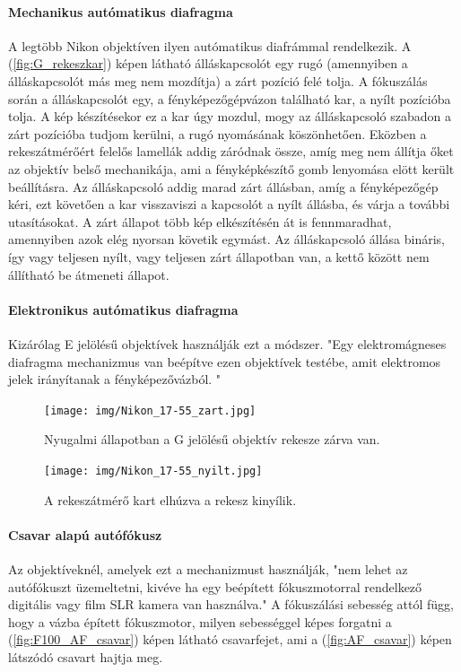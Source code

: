 \paragraph{Mechanikus autómatikus diafragma}
A legtöbb Nikon objektíven ilyen autómatikus diafrámmal rendelkezik. A (\ref{fig:G_rekeszkar}) képen látható álláskapcsolót egy rugó (amennyiben a álláskapcsolót más meg nem mozdítja) a zárt pozíció felé tolja. A fókuszálás során a álláskapcsolót egy, a fényképezőgépvázon található kar, a nyílt pozícióba tolja. A kép készítésekor ez a kar úgy mozdul, mogy az álláskapcsoló szabadon a zárt pozícióba tudjom kerülni, a rugó nyomásának köszönhetően. Eközben a rekeszátmérőért felelős lamellák addig záródnak össze, amíg meg nem állítja őket az objektív belső mechanikája, ami a fényképkészítő gomb lenyomása elött került beállításra. Az álláskapcsoló addig marad zárt állásban, amíg a fényképezőgép kéri, ezt követően a kar visszaviszi a kapcsolót a nyílt állásba, és várja a további utasításokat. A zárt állapot több kép elkészítésén át is fennmaradhat, amennyiben azok elég nyorsan követik egymást. Az álláskapcsoló állása bináris, így vagy teljesen nyílt, vagy teljesen zárt állapotban van, a kettő között nem állítható be átmeneti állapot.

\paragraph{Elektronikus autómatikus diafragma}
Kizárólag E jelölésű objektívek használják ezt a módszer. "Egy elektromágneses diafragma mechanizmus van beépítve ezen objektívek testébe, amit elektromos jelek irányítanak a fényképezővázból. "\cite{Lens_naming}

\begin{figure}[H]
	\centering
	\texttt{[image: img/Nikon\_17-55\_zart.jpg]}
	\caption{Nyugalmi állapotban a G jelölésű objektív rekesze zárva van.}
	\label{fig:17-55_zart}
\end{figure}

\begin{figure}[H]
	\centering
	\texttt{[image: img/Nikon\_17-55\_nyilt.jpg]}
	\caption{A rekeszátmérő kart elhúzva a rekesz kinyílik.}
	\label{fig:17-55_nyilt}
\end{figure}

\paragraph{Csavar alapú autófókusz}

Az objektíveknél, amelyek ezt a mechanizmust használják, "nem lehet az autófókuszt üzemeltetni, kivéve ha egy beépített fókuszmotorral rendelkező digitális vagy film SLR kamera van használva." A fókuszálási sebesség attól függ, hogy a vázba épített fókuszmotor, milyen sebességgel képes forgatni a (\ref{fig:F100_AF_csavar}) képen látható csavarfejet, ami a (\ref{fig:AF_csavar}) képen látszódó csavart hajtja meg.

